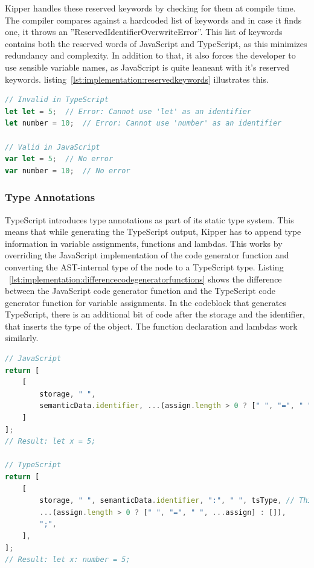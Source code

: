 Kipper handles these reserved keywords by checking for them at compile time. The compiler compares against a hardcoded list of keywords and in case it finds one, it throws an ''ReservedIdentifierOverwriteError''. This list of keywords contains both the reserved words of JavaScript and TypeScript, as this minimizes redundancy and complexity. In addition to that, it also forces the developer to use sensible variable names, as JavaScript is quite leaneant with it's reserved keywords. listing~\ref{lst:implementation:reservedkeywords} illustrates this.

\begin{lstlisting}[language=TypeScript,caption=Reserved Keywords in TS and JS,label=lst:implementation:reservedkeywords]
// Invalid in TypeScript
let let = 5;  // Error: Cannot use 'let' as an identifier
let number = 10;  // Error: Cannot use 'number' as an identifier

// Valid in JavaScript
var let = 5;  // No error
var number = 10;  // No error
\end{lstlisting}

\subsubsection{Type Annotations}
TypeScript introduces type annotations as part of its static type system. This means that while generating the TypeScript output, Kipper has to append type information in variable assignments, functions and lambdas. This works by overriding the JavaScript implementation of the code generator function and converting the AST-internal type of the node to a TypeScript type. Listing ~\ref{lst:implementation:differencecodegeneratorfunctions} shows the difference between the JavaScript code generator function and the TypeScript code generator function for variable assignments. In the codeblock that generates TypeScript, there is an additional bit of code after the storage and the identifier, that inserts the type of the object. The function declaration and lambdas work similarly.

\begin{lstlisting}[language=TypeScript,caption=Difference in code generator functions,label=lst:implementation:differencecodegeneratorfunctions]
// JavaScript
return [
	[
		storage, " ",
		semanticData.identifier, ...(assign.length > 0 ? [" ", "=", " ", ...assign] : []), ";"
	]
];
// Result: let x = 5;

// TypeScript
return [
	[
		storage, " ", semanticData.identifier, ":", " ", tsType, // This inserts the type
		...(assign.length > 0 ? [" ", "=", " ", ...assign] : []),
		";",
	],
];
// Result: let x: number = 5;
\end{lstlisting}

